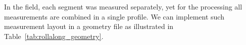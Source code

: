 \documentclass[a4paper,fleqn]{cas-sc}
\begin{document}

In the field, each segment was measured separately, yet for the processing all measurements are combined in a single profile. %
We can implement such measurement layout in a geometry file 
as illustrated in Table~\ref{tab:rollalong_geometry}. %
\end{document}
